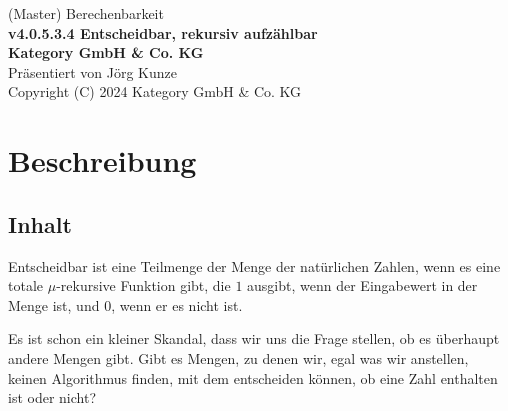 \documentclass[a4paper]{amsart}
\theoremstyle{definition}
\begin{document}
\begin{titlepage}
\centering
{\huge
(Master) Berechenbarkeit\\[1cm]
\textbf{v4.0.5.3.4 Entscheidbar, rekursiv aufzählbar}
}\\[1cm]

\textbf{Kategory GmbH \& Co. KG}\\
Präsentiert von Jörg Kunze\\
Copyright (C) 2024 Kategory GmbH \& Co. KG

\end{titlepage}

%

\newpage

\section*{Beschreibung}

\subsection*{Inhalt}
Entscheidbar ist eine Teilmenge der Menge der natürlichen Zahlen, wenn es eine totale $\mu$-rekursive Funktion gibt, die $1$ ausgibt, wenn der Eingabewert in der Menge ist, und $0$, wenn er es nicht ist.

Es ist schon ein kleiner Skandal, dass wir uns die Frage stellen, ob es überhaupt andere Mengen gibt. Gibt es Mengen, zu denen wir, egal was wir anstellen, keinen Algorithmus finden, mit dem entscheiden können, ob eine Zahl enthalten ist oder nicht?
\end{document}
